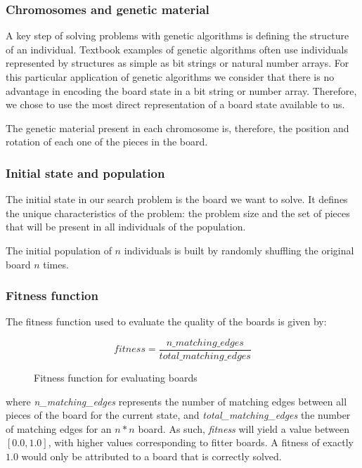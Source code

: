 \documentclass{llncs}
\begin{document}
\subsubsection{Chromosomes and genetic material}

A key step of solving problems with genetic algorithms is defining the structure of an individual. Textbook examples of genetic algorithms often use individuals represented by structures as simple as bit strings or natural number arrays. For this particular application of genetic algorithms we consider that there is no advantage in encoding the board state in a bit string or number array. Therefore, we chose to use the most direct representation of a board state available to us.

The genetic material present in each chromosome is, therefore, the position and rotation of each one of the pieces in the board.

\subsubsection{Initial state and population}

The initial state in our search problem is the board we want to solve. It defines the unique characteristics of the problem: the problem size and the set of pieces that will be present in all individuals of the population.

The initial population of $n$ individuals is built by randomly shuffling the original board $n$ times.

\subsubsection{Fitness function}\label{sec:fitness-function}

The fitness function used to evaluate the quality of the boards is given by:

\begin{figure}[H]
  \begin{equation}
    fitness = \frac{n\_matching\_edges}{total\_matching\_edges}
  \end{equation}
  \caption{Fitness function for evaluating boards}
  \label{fig:eq:fitness_function}
\end{figure}

where \textit{n\_matching\_edges} represents the number of matching edges between all pieces of the board for the current state, and \textit{total\_matching\_edges} the number of matching edges for an $n*n$ board. As such, \textit{fitness} will yield a value between $[0.0, 1.0]$, with higher values corresponding to fitter boards. A fitness of exactly $1.0$ would only be attributed to a board that is correctly solved.
\end{document}
